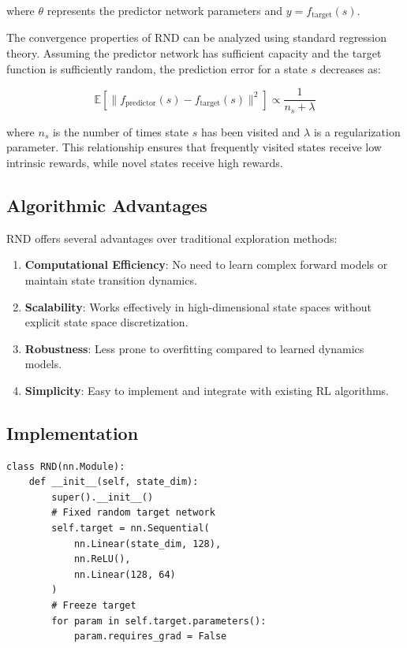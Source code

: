 \documentclass[12pt]{article}
\begin{document}
{{{where $\theta$ represents the predictor network parameters and $y = f_{\text{target}}(s)$.

The convergence properties of RND can be analyzed using standard regression theory. Assuming the predictor network has sufficient capacity and the target function is sufficiently random, the prediction error for a state $s$ decreases as:

\begin{equation}
\mathbb{E}[\| f_{\text{predictor}}(s) - f_{\text{target}}(s) \|^2] \propto \frac{1}{n_s + \lambda}
\end{equation}

where $n_s$ is the number of times state $s$ has been visited and $\lambda$ is a regularization parameter. This relationship ensures that frequently visited states receive low intrinsic rewards, while novel states receive high rewards.

\subsection{Algorithmic Advantages}

RND offers several advantages over traditional exploration methods:

\begin{enumerate}
\item \textbf{Computational Efficiency}: No need to learn complex forward models or maintain state transition dynamics.
\item \textbf{Scalability}: Works effectively in high-dimensional state spaces without explicit state space discretization.
\item \textbf{Robustness}: Less prone to overfitting compared to learned dynamics models.
\item \textbf{Simplicity}: Easy to implement and integrate with existing RL algorithms.
\end{enumerate}

\subsection{Implementation}

\begin{verbatim}
class RND(nn.Module):
    def __init__(self, state_dim):
        super().__init__()
        # Fixed random target network
        self.target = nn.Sequential(
            nn.Linear(state_dim, 128),
            nn.ReLU(),
            nn.Linear(128, 64)
        )
        # Freeze target
        for param in self.target.parameters():
            param.requires_grad = False
        

\end{verbatim}}}}
\end{document}
